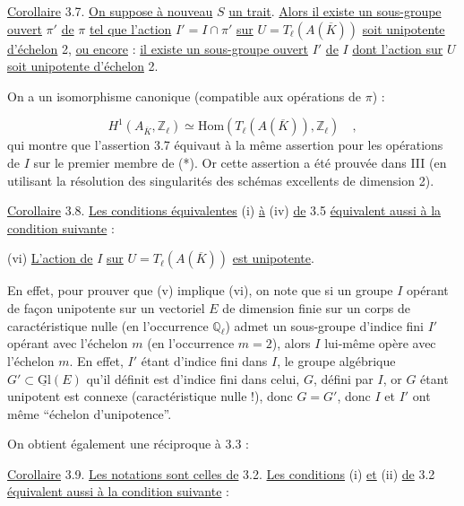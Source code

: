 \underline{Corollaire} 3.7. \underline{On suppose à nouveau} $S$ \underline{un trait}. \underline{Alors il existe un sous-groupe ouvert} $\pi'$ \underline{de} $\pi$ \underline{tel que l'action} $I' = I \cap \pi'$ \underline{sur} $U = T_\ell(A(\overline{K}))$ \underline{soit unipotente d'échelon} 2, \underline{ou encore} : \underline{il existe un sous-groupe ouvert} $I'$ \underline{de} $I$ \underline{dont l'action sur} $U$ \underline{soit unipotente d'échelon} 2.



On a un isomorphisme canonique (compatible aux opérations de $\pi$) :

\begin{equation}\tag{*}
H^1(A_{\overline{K}}, \mathbb{Z}_\ell) \simeq \mathrm{Hom}(T_\ell(A(\overline{K})), \mathbb{Z}_\ell) \quad ,
\end{equation}
qui montre que l'assertion 3.7 équivaut à la même assertion pour les opérations de $I$ sur le premier membre de (*). Or cette assertion a été prouvée dans III \hspace{2em} (en utilisant la résolution des singularités des schémas excellents de dimension 2).

\underline{Corollaire} 3.8. \underline{Les conditions équivalentes} (i) \underline{à} (iv) \underline{de} 3.5 \underline{équivalent aussi à la condition suivante} :

(vi) \quad \underline{L'action de} $I$ \underline{sur} $U = T_\ell(A(\overline{K}))$ \underline{est unipotente}.

En effet, pour prouver que (v) implique (vi), on note que si un groupe $I$ opérant de façon unipotente sur un vectoriel $E$ de dimension finie sur un corps de caractéristique nulle (en l'occurrence $\mathbb{Q}_\ell$) admet un sous-groupe d'indice fini $I'$ opérant avec l'échelon $m$ (en l'occurrence $m=2$), alors $I$ lui-même opère avec l'échelon $m$. En effet, $I'$ étant d'indice fini dans $I$, le groupe algébrique $G' \subset \underline{\mathrm{Gl}}(E)$ qu'il définit est d'indice fini dans celui, $G$, défini par $I$, or $G$ étant unipotent est connexe (caractéristique nulle !), donc $G=G'$, donc $I$ et $I'$ ont même ``échelon d'unipotence''.

On obtient également une réciproque à 3.3 :

\underline{Corollaire} 3.9. \underline{Les notations sont celles de} 3.2. \underline{Les conditions} (i) \underline{et} (ii) \underline{de} 3.2 \underline{équivalent aussi à la condition suivante} :


